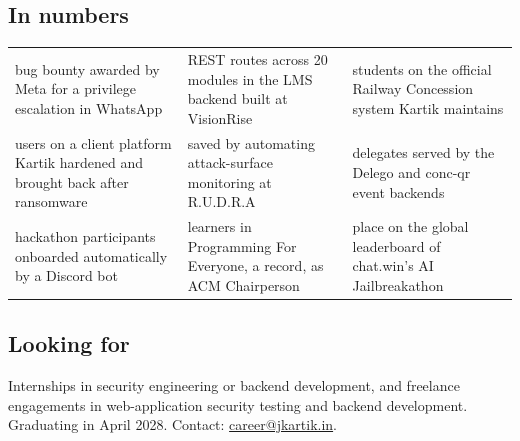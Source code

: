 \subsection*{In numbers}
\vspace{3pt}
\newcommand{\stat}[2]{%
  \leavevmode{\fontsize{19}{22}\selectfont\color{accent}#1}\par\vspace{1.5pt}%
  {\footnotesize\color{muted}#2}\par\vspace{13pt}}
{\renewcommand{\arraystretch}{1.0}%
\noindent\begin{tabularx}{\linewidth}{@{}>{\raggedright\arraybackslash}X@{\hspace{7mm}}>{\raggedright\arraybackslash}X@{\hspace{7mm}}>{\raggedright\arraybackslash}X@{}}
\stat{\$1,500}{bug bounty awarded by Meta for a privilege escalation in WhatsApp}
& \stat{276}{REST routes across 20 modules in the LMS backend built at VisionRise}
& \stat{\tld4,000}{students on the official Railway Concession system Kartik maintains} \\
\stat{16,000+}{users on a client platform Kartik hardened and brought back after ransomware}
& \stat{\tld\$20,000/yr}{saved by automating attack-surface monitoring at R.U.D.R.A}
& \stat{600+ \,/\, 500+}{delegates served by the Delego and conc-qr event backends} \\
\stat{1,100+}{hackathon participants onboarded automatically by a Discord bot}
& \stat{\tld500}{learners in Programming For Everyone, a record, as ACM Chairperson}
& \stat{1st}{place on the global leaderboard of chat.win's AI Jailbreakathon} \\
\end{tabularx}}

\subsection*{Looking for}
Internships in security engineering or backend development, and freelance engagements in
web-application security testing and backend development. Graduating in April 2028.
Contact: \mbox{\href{mailto:career@jkartik.in}{career@jkartik.in}}.

\clearpage
